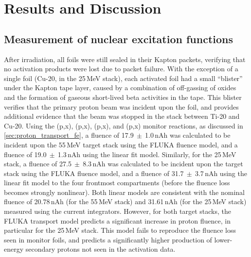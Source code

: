 \section{\label{sec:results_fe}Results and Discussion}


\subsection{Measurement of nuclear excitation functions}

After irradiation, all foils were 
still sealed in their Kapton packets, verifying that no activation products were lost due to packet failure.
With the exception of a single foil (Cu-20, in the 25\,MeV stack), each activated foil had a small \enquote{blister} under the Kapton tape layer, caused by a combination of 
off-gassing of oxides and the formation of gaseous short-lived beta activities in the tape.
This blister   verifies that the primary proton beam was incident upon the foil, and provides additional 
evidence 
that the beam was stopped in the stack between Ti-20 and Cu-20.
Using the (p,x), (p,x), (p,x), and (p,x) monitor reactions, as discussed in \autoref{sec:proton_transport_fe}, a fluence of 17.9$~\pm~$1.0\,nAh 
was calculated to be incident upon the 55\,MeV target stack using the FLUKA fluence model, and a  fluence of 19.0$~\pm~$1.3\,nAh using the linear fit model.
Similarly, for the 25\,MeV stack, a fluence of 27.5$~\pm~$8.3\,nAh 
was calculated to be incident upon the 
target stack using the FLUKA fluence model, and a  fluence of 31.7$~\pm~$3.7\,nAh using the linear fit model to the four frontmost compartments (before the fluence loss becomes strongly nonlinear).
Both linear models are consistent with the nominal fluence of 20.78\,nAh (for the 55\,MeV stack) and 31.61\,nAh (for the 25\,MeV stack) measured using the 
current integrators.
However, for both target stacks, the FLUKA transport model predicts a significant increase in proton fluence, in particular for the 25\,MeV stack.
This model fails to reproduce the fluence loss seen in monitor foils, and predicts a significantly higher production of lower-energy secondary protons not seen in the activation data.
